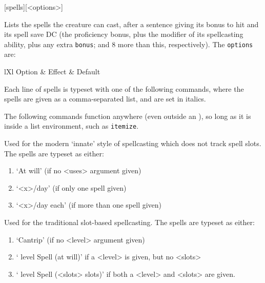 			[spells]{[<options>]}
			{
				Lists the spells the creature can cast, after a sentence giving its bonus to hit and its spell save DC (the proficiency bonus, plus the modifier of its spellcasting ability, plus any extra \texttt{bonus}; and 8 more than this, respectively). The \texttt{options} are:
				\begin{RpgTable}{lXl}
					Option & Effect & Default
				\end{RpgTable}
			}

			Each line of spells is typeset with one of the following commands, where the spells are given as a comma-separated list, and are set in italics.

			The following commands function anywhere (even outside an ), so long as it is inside a list environment, such as \texttt{itemize}.
			{
				Used for the modern `innate' style of spellcasting which does not track spell slots. The spells are typeset as either:
				\begin{enumerate}
					\item `At will' (if no <uses> argument given)
					\item `<x>/day' (if only one spell given)
					\item `<x>/day each' (if more than one spell given)
				\end{enumerate}
			}
			{
				Used for the traditional slot-based spellcasting. The spells are typeset as either:
				\begin{enumerate}
					\item `Cantrip' (if no <level> argument given)

					\item ` level Spell (at will)' if a <level> is given, but no <slots>
					\item ` level Spell (<slots> slots)' if both a <level> and <slots> are given.
				\end{enumerate}
			}

